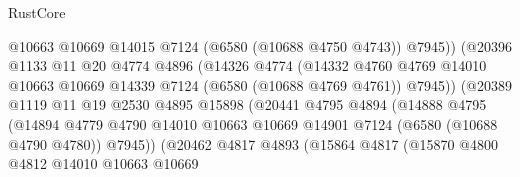 \begin{lexlean}{RustCore}
\begin{coremodule}
                                    @10663
                                    @10669
                                    @14015
                                    @7124
                                    (@6580 (@10688 @4750 @4743))
                                    @7945))
                                (@20396
                                  @1133
                                  @11
                                  @20
                                  @4774
                                  @4896
                                  (@14326
                                    @4774
                                    (@14332
                                      @4760
                                      @4769
                                      @14010
                                      @10663
                                      @10669
                                      @14339
                                      @7124
                                      (@6580 (@10688 @4769 @4761))
                                      @7945))
                                  (@20389
                                    @1119
                                    @11
                                    @19
                                    @2530
                                    @4895
                                    @15898
                                    (@20441
                                      @4795
                                      @4894
                                      (@14888
                                        @4795
                                        (@14894
                                          @4779
                                          @4790
                                          @14010
                                          @10663
                                          @10669
                                          @14901
                                          @7124
                                          (@6580 (@10688 @4790 @4780))
                                          @7945))
                                      (@20462
                                        @4817
                                        @4893
                                        (@15864
                                          @4817
                                          (@15870
                                            @4800
                                            @4812
                                            @14010
                                            @10663
                                            @10669

\end{coremodule}
\end{lexlean}
